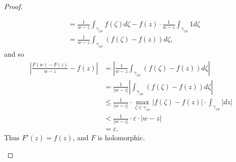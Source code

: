 \documentclass[12pt,openany]{book}
\theoremstyle{definition}
\newcommand{\of}[1]{\left( #1 \right)}
\newcommand{\abs}[1]{\left\lvert #1 \right\rvert}
\begin{document}
\begin{proof}
\begin{enumerate}[(i)]
\begin{align*}
			&=\frac{1}{w-z}\int_{\gamma_{zw}}f\of{\zeta}d\zeta-f\of{z}\cdot\frac{1}{w-z}\int_{\gamma_{zw}}1d\zeta\\
			&=\frac{1}{w-z}\int_{\gamma_{zw}}\of{f\of{\zeta}-f\of{z}}d\zeta,
			\end{align*} and so \begin{align*}
			\abs{\frac{F\of{w}-F\of{z}}{w-z}-f\of{z}}&=\abs{\frac{1}{w-z}\int_{\gamma_{zw}}\of{f\of{\zeta}-f\of{z}}d\zeta}\\
			&=\frac{1}{\abs{w-z}}\abs{\int_{\gamma_{zw}}\of{f\of{\zeta}-f\of{z}}d\zeta}\\
			&\leq\frac{1}{\abs{w-z}}\cdot\max_{\zeta\in\gamma_{zw}}\abs{f\of{\zeta}-f\of{z}}\cdot\int_{\gamma_{zw}}\abs{dz}\\
			&<\frac{1}{\abs{w-z}}\cdot\varepsilon\cdot\abs{w-z}\\
			&=\varepsilon.
			\end{align*} Thus $F'\of{z}=f\of{z}$, and $F$ is holomorphic.
		\end{enumerate}
	\end{proof}
	
	\newpage
\end{document}
